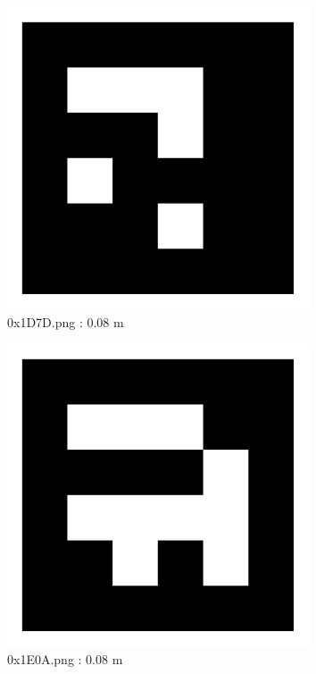 \documentclass[11pt,a4,BCOR=0cm]{scrartcl}
\begin{document}
\begin{figure}
  \centering
    \includegraphics[width=8.955cm]{0x1D7D.pdf}
    \caption{0x1D7D.png : 0.08 m}
    \label{fig:0x1D7D.pdf}
  
\end{figure} 

\begin{figure}
  \centering
    \includegraphics[width=8.955cm]{0x1E0A.pdf}
    \caption{0x1E0A.png : 0.08 m}
    \label{fig:0x1E0A.pdf}
  
\end{figure} 

\clearpage
\end{document}
